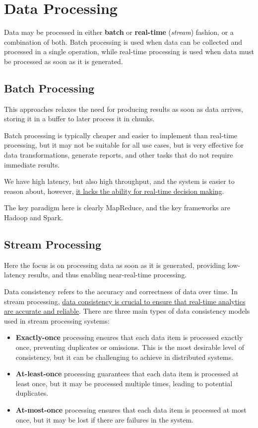 \chapter{Data Processing}

Data may be processed in either \textbf{batch} or \textbf{real-time} (\textit{stream}) fashion, or a combination of both. Batch processing is used when data can be collected and processed in a single operation, while real-time processing is used when data must be processed as soon as it is generated.

\section{Batch Processing}
This approaches relaxes the need for producing results as soon as data arrives, storing it in a buffer to later process it in chunks.

Batch processing is typically cheaper and easier to implement than real-time processing, but it may not be suitable for all use cases, but is very effective for data transformations, generate reports, and other tasks that do not require immediate results.

We have high latency, but also high throughput, and the system is easier to reason about, however, \ul{it lacks the ability for real-time decision making}.

The key paradigm here is clearly MapReduce, and the key frameworks are Hadoop and Spark.

\section{Stream Processing}

Here the focus is on processing data as soon as it is generated, providing low-latency results, and thus enabling near-real-time processing.


Data consistency refers to the accuracy and correctness of data over time.
In stream processing, \ul{data consistency is crucial to ensure that real-time analytics are accurate and reliable}. 
There are three main types of data consistency models used in stream processing systems:
\begin{itemize}
   \item \textbf{Exactly-once} processing ensures that each data item is processed exactly once, preventing duplicates or omissions. This is the most desirable level of consistency, but it can be challenging to achieve in distributed systems.
   \item \textbf{At-least-once} processing guarantees that each data item is processed at least once, but it may be processed multiple times, leading to potential duplicates.
   \item \textbf{At-most-once} processing ensures that each data item is processed at most once, but it may be lost if there are failures in the system.
\end{itemize}


